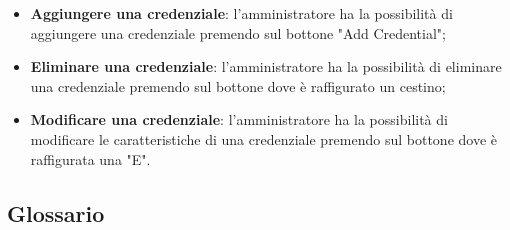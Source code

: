 \begin{itemize}
\item \textbf{Aggiungere una credenziale}: l'amministratore ha la possibilità di aggiungere una credenziale premendo sul bottone "Add Credential"; \\
\item \textbf{Eliminare una credenziale}: l'amministratore ha la possibilità di eliminare una credenziale premendo sul bottone dove è raffigurato un cestino; \\
\item \textbf{Modificare una credenziale}:  l'amministratore ha la possibilità di modificare le caratteristiche di una credenziale premendo sul bottone dove è raffigurata una "E". \\
\end{itemize}

\subsection{Glossario}





